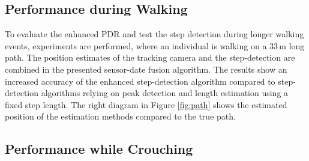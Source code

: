 \documentclass[engproc,conferenceproceedings,submit,pdftex,moreauthors]{Definitions/mdpi}
\begin{document}
\subsection{Performance during Walking}

To evaluate the enhanced PDR and test the step detection during longer walking events, experiments are performed, where an individual is walking on a 33\,m long path. The position estimates of the tracking camera and the step-detection are combined in the presented sensor-date fusion algorithm.
The results show an increased accuracy of the enhanced step-detection algorithm compared to step-detection algorithms relying on peak detection and length estimation using a fixed step length. The right diagram in Figure \ref{fig:path} shows the estimated position of the estimation methods compared to the true path.

\subsection{Performance while Crouching} 
\end{document}
